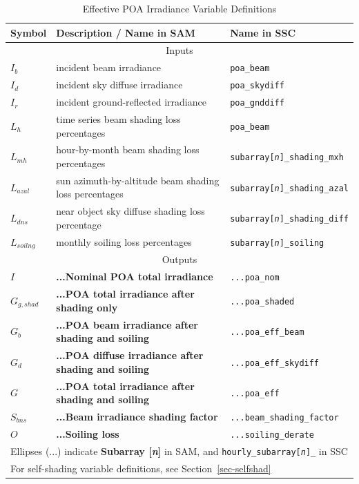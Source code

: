 \documentclass[12pt,letterpaper]{article}
\begin{document}
\begin{table}
\begin{center}
\caption{Effective POA Irradiance Variable Definitions}
\begin{tabular}{lll}
\midrule
Symbol & Description / \textbf{Name in SAM} & Name in SSC\\
\midrule
\multicolumn{3}{c}{Inputs}\\
$I_b$ & incident beam irradiance  & \texttt{poa\_beam}\\
$I_d$ & incident sky diffuse irradiance & \texttt{poa\_skydiff}\\
$I_r$ & incident ground-reflected irradiance & \texttt{poa\_gnddiff}\\
$L_h$ & time series beam shading loss percentages  & \texttt{poa\_beam}\\
$L_{mh}$ & hour-by-month beam shading loss percentages & \texttt{subarray[\textit{n}]\_shading\_mxh}\\
$L_{azal}$ & sun azimuth-by-altitude beam shading loss percentages & \texttt{subarray[\textit{n}]\_shading\_azal}\\
$L_{dns}$ & near object sky diffuse shading loss percentage  & \texttt{subarray[\textit{n}]\_shading\_diff}\\
$L_{soilng}$ & monthly soiling loss percentages  & \texttt{subarray[\textit{n}]\_soiling}\\
\midrule
\multicolumn{3}{c}{Outputs}\\
$I$ & \textbf{...Nominal POA total irradiance} & \texttt{...poa\_nom}\\
$G_{g,shad}$ & \textbf{...POA total irradiance after shading only} & \texttt{...poa\_shaded}\\
$G_b$ & \textbf{...POA beam irradiance after shading and soiling} & \texttt{...poa\_eff\_beam}\\
$G_d$ & \textbf{...POA diffuse irradiance after shading and soiling} & \texttt{...poa\_eff\_skydiff}\\
$G$ & \textbf{...POA total irradiance after shading and soiling} & \texttt{...poa\_eff}\\
$S_{bns}$ & \textbf{...Beam irradiance shading factor} & \texttt{...beam\_shading\_factor}\\
$O$ & \textbf{...Soiling loss} & \texttt{...soiling\_derate}\\
\midrule
\multicolumn{3}{l}{Ellipses (...) indicate \textbf{Subarray [\textit{n}]} in SAM, and \texttt{hourly\_subarray[\textit{n}]\_} in SSC}\\
\multicolumn{3}{l}{For self-shading variable definitions, see Section~\ref{sec-selfshad}}\\
\end{tabular}
\label{tab-effectiveirradiancevars}
\end{center}
\end{table}
\end{document}
